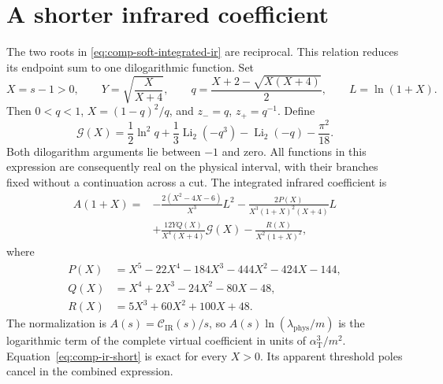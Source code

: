 \section{A shorter infrared coefficient}
\label{sec:comp-ir-simplification}
The two roots in \eqref{eq:comp-soft-integrated-ir} are reciprocal.
This relation reduces its endpoint sum to one dilogarithmic function.
Set
\begin{equation}
 X=s-1>0,\qquad Y=\sqrt{\frac{X}{X+4}},\qquad
 q=\frac{X+2-\sqrt{X(X+4)}}2,\qquad L=\ln(1+X).
\end{equation}
Then $0<q<1$, $X=(1-q)^2/q$, and $z_-=q$, $z_+=q^{-1}$.
Define
\begin{equation}
 \mathcal G(X)=\frac12\ln^2q
 +\frac13\operatorname{Li}_2(-q^3)
 -\operatorname{Li}_2(-q)-\frac{\pi^2}{18}.
 \label{eq:comp-ir-short-function}
\end{equation}
Both dilogarithm arguments lie between $-1$ and zero.  All functions
in this expression are consequently real on the physical interval,
with their branches fixed without a continuation across a cut.
The integrated infrared coefficient is
\begin{equation}
 \begin{aligned}
 A(1+X)={}&-\frac{2(X^2-4X-6)}{X^3}L^2
 -\frac{2P(X)}{X^3(1+X)^2(X+4)}L\\
 &+\frac{12YQ(X)}{X^4(X+4)}\mathcal G(X)
 -\frac{R(X)}{X^2(1+X)^2},
 \end{aligned}
 \label{eq:comp-ir-short}
\end{equation}
where
\begin{align}
 P(X)&=X^5-22X^4-184X^3-444X^2-424X-144,\\
 Q(X)&=X^4+2X^3-24X^2-80X-48,\\
 R(X)&=5X^3+60X^2+100X+48.
\end{align}
The normalization is $A(s)=\mathcal C_{\mathrm{IR}}(s)/s$, so
$A(s)\ln(\lambda_{\mathrm{phys}}/m)$ is the logarithmic term of the
complete virtual coefficient in units of $\alpha_{\mathrm T}^3/m^2$.
Equation~\eqref{eq:comp-ir-short} is exact for every $X>0$.
Its apparent threshold poles cancel in the combined expression.

